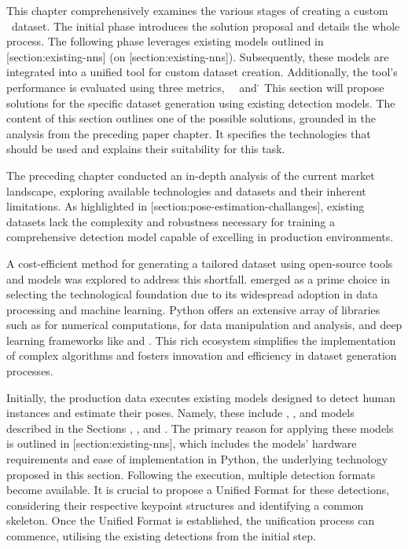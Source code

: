 This chapter comprehensively examines the various stages of creating a custom \HPE\ dataset. The initial phase introduces the solution proposal and details the whole process. The following phase leverages existing models outlined in [section:existing-nns] (on [section:existing-nns]). Subsequently, these models are integrated into a unified tool for custom dataset creation. Additionally, the tool's performance is evaluated using three metrics, \OKS\, \APE\ and \MSE\.

This section will propose solutions for the specific dataset generation using existing \pojem{\NN} detection models. The content of this section outlines one of the possible solutions, grounded in the analysis from the preceding paper chapter. It specifies the technologies that should be used and explains their suitability for this task.

The preceding chapter conducted an in-depth analysis of the current market landscape, exploring available technologies and datasets and their inherent limitations. As highlighted in [section:pose-estimation-challanges], existing datasets lack the complexity and robustness necessary for training a comprehensive detection model capable of excelling in production environments.

A cost-efficient method for generating a tailored dataset using open-source tools and models was explored to address this shortfall.  emerged as a prime choice in selecting the technological foundation due to its widespread adoption in data processing and machine learning. Python offers an extensive array of libraries such as  for numerical computations,  for data manipulation and analysis, and deep learning frameworks like  and . This rich ecosystem simplifies the implementation of complex algorithms and fosters innovation and efficiency in dataset generation processes.

Initially, the production data executes existing models designed to detect human instances and estimate their poses. Namely, these include , , and  models described in the Sections , , and . The primary reason for applying these models is outlined in [section:existing-nns], which includes the models' hardware requirements and ease of implementation in Python, the underlying technology proposed in this section. Following the execution, multiple detection formats become available. It is crucial to propose a Unified Format for these detections, considering their respective keypoint structures and identifying a common skeleton. Once the Unified Format is established, the unification process can commence, utilising the existing detections from the initial step.

